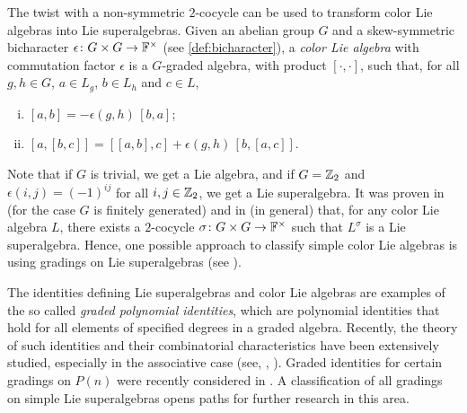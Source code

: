 
The twist with a non-symmetric $2$-cocycle can be used to transform color Lie algebras into Lie superalgebras. 
Given an abelian group $G$ and a skew-symmetric bicharacter $\epsilon\colon G\times G \to \mathbb{F}^\times$ (see \cref{def:bicharacter}), a \emph{color Lie algebra} with commutation factor $\epsilon$ is a $G$-graded algebra, with product $[\cdot, \cdot]$, such that, for all $g, h \in G$, $a \in L_g$, $b \in L_h$ and $c \in L$,
\begin{enumerate}[(i)]
    \item $[a, b] 
    = -\epsilon(g, h)\,[b,a]$;
    \item $[a, [b, c]] 
    = [[a,b],c] + \epsilon(g, h)\,[b,[a,c]]$.
\end{enumerate}
%
Note that if $G$ is trivial, we get a Lie algebra, and if $G = \mathbb{Z}_2$ and $\epsilon(i,j) = (-1)^{ij}$ for all $i,j \in \mathbb{Z}_2$, we get a Lie superalgebra. 
It was proven in \cite{MR529734} (for the case $G$ is finitely generated) and in \cite{MR1600092} (in general) that, for any color Lie algebra $L$, there exists a $2$-cocycle $\sigma\colon G\times G \to \mathbb{F}^\times$ such that $L^\sigma$ is a Lie superalgebra. 
Hence, one possible approach to classify simple color Lie algebras is using gradings on Lie superalgebras (see \cite{MR2497949}).


The identities defining Lie superalgebras and color Lie algebras are examples of the so called \emph{graded polynomial identities}, which are polynomial identities that hold for all elements of specified degrees in a graded algebra. 
Recently, the theory of such identities and their combinatorial characteristics have been extensively studied, especially in the associative case (see, \eg, \cite{MR1935223,MR2176105,MR2680170,MR2639274,MR3068959,MR3030542,MR3152711,MR3271263,MR3773068}). 
Graded identities for certain gradings on $P(n)$ were recently considered in \cite{MR3611462}. 
A classification of all gradings on simple Lie superalgebras opens paths for further research in this area. 

